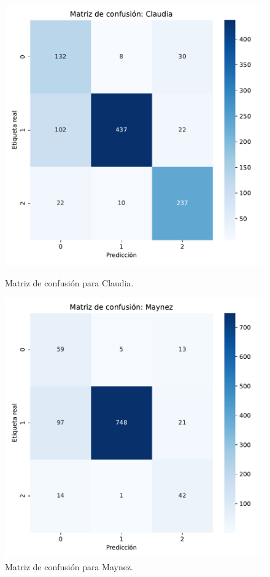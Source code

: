 \documentclass[10pt, a4paper]{article}
\begin{document}
	\begin{figure}[h!]
		\centering
		\begin{minipage}{0.4\textwidth} %
			\includegraphics[width=\linewidth]{conf_matrix_Claudia.pdf} 
			\caption{Matriz de confusión para Claudia.}
			\label{fig:cmClaudia}
		\end{minipage}
		\hfill %
		\begin{minipage}{0.4\textwidth}
			\includegraphics[width=\linewidth]{conf_matrix_Maynez.pdf}
			\caption{Matriz de confusión para Maynez.}
			\label{fig:cmMaynez}
		\end{minipage}
	\end{figure}
	
\end{document}
